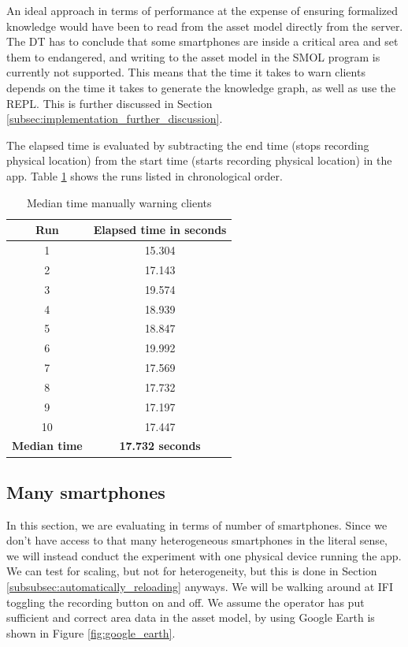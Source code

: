 \documentclass{article}
\begin{document}
An ideal approach in terms of performance at the expense of ensuring formalized knowledge would have been to read from the asset model directly from the server. The DT has to conclude that some smartphones are inside a critical area and set them to endangered, and writing to the asset model in the SMOL program is currently not supported. This means that the time it takes to warn clients depends on the time it takes to generate the knowledge graph, as well as use the REPL. This is further discussed in Section \ref{subsec:implementation_further_discussion}.

The elapsed time is evaluated by subtracting the end time (stops recording physical location) from the start time (starts recording physical location) in the app. Table \ref{tab:time_manual_work} shows the runs listed in chronological order.
\begin{table}[H]
    \centering
    \begin{tabular}{|c|c|}
        \hline
        \textbf{Run} & \textbf{Elapsed time in seconds} \\
        \hline
         1 & 15.304 \\ 
         2 & 17.143 \\ 
         3 & 19.574 \\
         4 & 18.939 \\
         5 & 18.847 \\
         6 & 19.992 \\
         7 & 17.569 \\ 
         8 & 17.732 \\ 
         9 & 17.197 \\ 
         10 & 17.447 \\
         \hline
         \textbf{Median time} & \textbf{17.732 seconds} \\
         \hline
    \end{tabular}
    \caption{Median time manually warning clients}
    \label{tab:time_manual_work}
\end{table}


\subsection{Many smartphones}
In this section, we are evaluating in terms of number of smartphones. Since we don't have access to that many heterogeneous smartphones in the literal sense, we will instead conduct the experiment with one physical device running the app. We can test for scaling, but not for heterogeneity, but this is done in Section \ref{subsubsec:automatically_reloading} anyways. We will be walking around at IFI toggling the recording button on and off. We assume the operator has put sufficient and correct area data in the asset model, by using Google Earth is shown in Figure \ref{fig:google_earth}.
\end{document}
